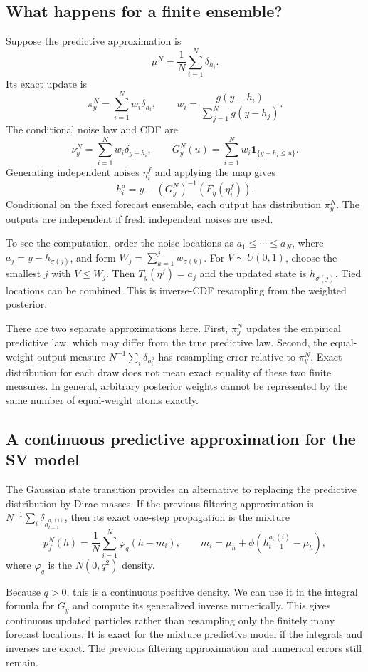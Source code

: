 \subsection{What happens for a finite ensemble?}

Suppose the predictive approximation is
\[
\mu^N=\frac1N\sum_{i=1}^N\delta_{h_i}.
\]
Its exact update is
\[
\pi_y^N=\sum_{i=1}^N w_i\delta_{h_i},\qquad
w_i=\frac{g(y-h_i)}{\sum_{j=1}^N g(y-h_j)}.
\]
The conditional noise law and CDF are
\[
\nu_y^N=\sum_{i=1}^N w_i\delta_{y-h_i},\qquad
G_y^N(u)=\sum_{i=1}^N w_i\mathbf 1_{\{y-h_i\le u\}}.
\]
Generating independent noises $\eta_i^f$ and applying the map gives
\[
h_i^a=y-(G_y^N)^{-1}(F_\eta(\eta_i^f)).
\]
Conditional on the fixed forecast ensemble, each output has distribution
$\pi_y^N$. The outputs are independent if fresh independent noises are used.

To see the computation, order the noise locations as
$a_1\le\cdots\le a_N$, where $a_j=y-h_{\sigma(j)}$, and form
$W_j=\sum_{k=1}^j w_{\sigma(k)}$. For $V\sim U(0,1)$, choose
the smallest $j$ with $V\le W_j$. Then $T_y(\eta^f)=a_j$ and the
updated state is $h_{\sigma(j)}$. Tied locations can be combined.
This is inverse-CDF resampling from the weighted posterior.

There are two separate approximations here. First, $\pi_y^N$ updates
the empirical predictive law, which may differ from the true predictive
law. Second, the equal-weight output measure
$N^{-1}\sum_i\delta_{h_i^a}$ has resampling error relative to $\pi_y^N$.
Exact distribution for each draw does not mean exact equality of
these two finite measures. In general, arbitrary posterior weights
cannot be represented by the same number of equal-weight atoms exactly.

\subsection{A continuous predictive approximation for the SV model}

The Gaussian state transition provides an alternative to replacing the
predictive distribution by Dirac masses. If the previous filtering
approximation is $N^{-1}\sum_i\delta_{h_{t-1}^{a,(i)}}$, then its exact
one-step propagation is the mixture
\[
p_f^N(h)=\frac1N\sum_{i=1}^N
\varphi_q(h-m_i),\qquad
m_i=\mu_h+\phi(h_{t-1}^{a,(i)}-\mu_h),
\]
where $\varphi_q$ is the $N(0,q^2)$ density.

Because $q>0$, this is a continuous positive density. We can use it in
the integral formula for $G_y$ and compute its generalized inverse
numerically. This gives continuous updated particles rather than
resampling only the finitely many forecast locations. It is exact for
the mixture predictive model if the integrals and inverses are exact.
The previous filtering approximation and numerical errors still remain.


